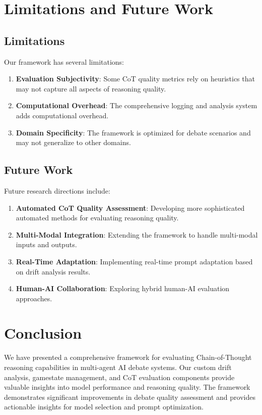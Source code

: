\documentclass[11pt]{article}
\begin{document}
\section{Limitations and Future Work}

\subsection{Limitations}

Our framework has several limitations:

\begin{enumerate}
    \item \textbf{Evaluation Subjectivity}: Some CoT quality metrics rely on heuristics that may not capture all aspects of reasoning quality.
    \item \textbf{Computational Overhead}: The comprehensive logging and analysis system adds computational overhead.
    \item \textbf{Domain Specificity}: The framework is optimized for debate scenarios and may not generalize to other domains.
\end{enumerate}

\subsection{Future Work}

Future research directions include:

\begin{enumerate}
    \item \textbf{Automated CoT Quality Assessment}: Developing more sophisticated automated methods for evaluating reasoning quality.
    \item \textbf{Multi-Modal Integration}: Extending the framework to handle multi-modal inputs and outputs.
    \item \textbf{Real-Time Adaptation}: Implementing real-time prompt adaptation based on drift analysis results.
    \item \textbf{Human-AI Collaboration}: Exploring hybrid human-AI evaluation approaches.
\end{enumerate}

\section{Conclusion}

We have presented a comprehensive framework for evaluating Chain-of-Thought reasoning capabilities in multi-agent AI debate systems. Our custom drift analysis, gamestate management, and CoT evaluation components provide valuable insights into model performance and reasoning quality. The framework demonstrates significant improvements in debate quality assessment and provides actionable insights for model selection and prompt optimization.
\end{document}
